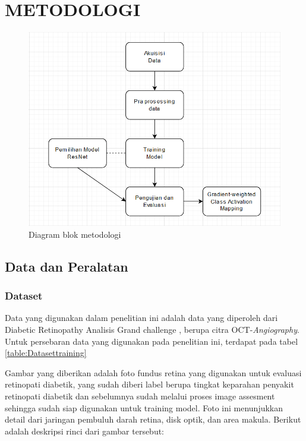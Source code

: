 \chapter{METODOLOGI}
\label{chap:3}

\begin{figure} [H] 
	\centering
	\includegraphics[scale=0.75]{gambar/diagramMethod.png}
	\caption{Diagram blok metodologi}
	\label{fig:diagramMethod}
\end{figure}

\section{Data dan Peralatan}
\label{sec:31}

\subsection{Dataset}
\label{sec:311}
Data yang digunakan dalam penelitian ini adalah data yang diperoleh dari Diabetic Retinopathy Analisis Grand challenge \parencite{drac_challenge_2023_10280359}, berupa citra OCT-\emph{Angiography}.
Untuk persebaran data yang digunakan pada penelitian ini, terdapat pada tabel \ref{table:Datasettraining}

Gambar yang diberikan adalah foto fundus retina yang digunakan untuk evaluasi retinopati diabetik, yang sudah diberi label berupa tingkat keparahan penyakit retinopati diabetik dan sebelumnya sudah melalui proses image assesment sehingga sudah siap digunakan untuk training model.
Foto ini menunjukkan detail dari jaringan pembuluh darah retina, disk optik, dan area makula. Berikut adalah deskripsi rinci dari gambar tersebut:

